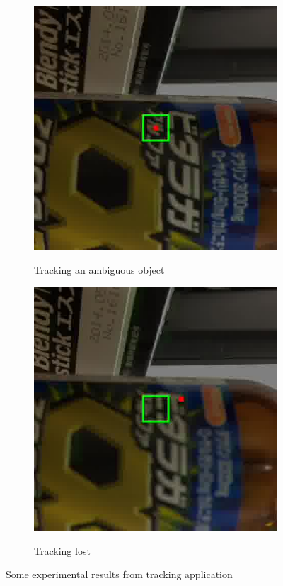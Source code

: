 \begin{figure}[t]
\begin{subfigure}[c]{.45\linewidth}
	   \includegraphics[width=0.9\linewidth]{tls1}
\label{lss1}
\caption{Tracking an ambiguous object}
\end{subfigure}%
\hspace{.01\linewidth}
\begin{subfigure}[c]{.45\linewidth}
	   \includegraphics[width=0.9\linewidth]{tls2}
\label{lss2}
\caption{ Tracking lost}
\end{subfigure}%
    \caption{Some experimental results from tracking application}
    \label{trackim}
\end{figure}
